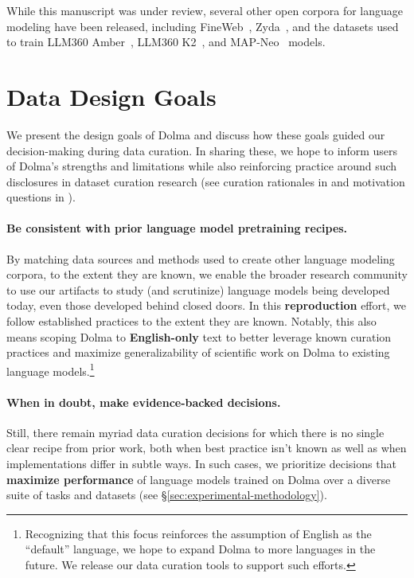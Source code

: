 \documentclass{article}
\newcommand{\dolma}{Dolma\xspace}
\begin{document}
{\noindent While this manuscript was under review, several other open corpora for language modeling have been released, including FineWeb~\citep{fineweb}, Zyda~\citep{tokpanov2024zyda}, and the datasets used to train LLM360 Amber~\citep{liu2023llm360}, LLM360 K2~\citep{llm360K2}, and MAP-Neo~\citep{zhang2024mapneo} models.}

\section{Data Design Goals}
\label{sec:desiderata}

We present the design goals of \dolma and discuss how these goals guided our decision-making during data curation.
In sharing these, we hope to inform users of \dolma's strengths and limitations while also reinforcing practice around such disclosures in dataset curation research (see curation rationales in \citet{bender-friedman-2018-data} and motivation questions in \citet{gebru2021datasheets}).

\paragraph{Be consistent with prior language model pretraining recipes.}
By matching data sources and methods used to create other language modeling corpora, to the extent they are known, we enable the broader research community to use our artifacts to 
study (and scrutinize) language models being developed today, even those developed behind closed doors.
In this \textbf{reproduction} effort, we follow established practices 
to the extent they are known.
Notably, this also means scoping \dolma to \textbf{English-only} text to better leverage known curation practices and maximize generalizability of scientific work on \dolma to existing language models.\footnote{Recognizing that this focus reinforces the assumption of English as the ``default'' language, we hope to expand \dolma to more languages in the future. We release our data curation tools to support such efforts.
}

\paragraph{When in doubt, make evidence-backed decisions.} Still, there remain myriad data curation decisions for which there is no single clear recipe from prior work, both when best practice isn't known as well as when implementations differ in subtle ways.
In such cases, we prioritize decisions that \textbf{maximize performance} of language models trained on \dolma over a diverse suite of tasks and datasets (see \S\ref{sec:experimental-methodology}).
\end{document}
